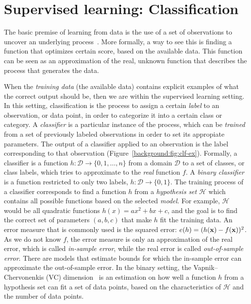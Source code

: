 \section{Supervised learning: Classification}

The basic premise of learning from data is the use of a set of observations to
uncover an underlying process~\cite{Abu-Mostafa:2012:LD:2207825}. 
%
More formally, a way to see this is finding a function that optimizes certain
score, based on the available data. 
%
This function can be seen as an approximation of the real, unknown function
that describes the process that generates the data.


When the {\em training data} (the available data) contains explicit examples of
what the correct output should be, then we are within the supervised learning
setting.
%
In this setting, classification is the process to assign a certain {\em label}
to an observation, or data point, in order to categorize it into a certain class
or category.
%
A {\em classifier} is a particular instance of the process, which can be {\em
trained} from a set of previously labeled observations in order to set its
appropiate parameters.
%
The output of a classifier applied to an observation is the label corresponding
to that observation (Figure~\ref{background:fig:clf-ex}).
%
Formally, a classifier is a function $h: \mathcal{D} \rightarrow \{0, 1, \ldots,
n\}$ from a domain $\mathcal{D}$ to a set of classes, or class labels, which
tries to approximate to the {\em real} function $f$.
%
A {\em binary classifier} is a function restricted to only two labels, $h:
\mathcal{D} \rightarrow \{0, 1\}$.
%
The training process of a classifier corresponds to find a function $h$ from a
{\em hypothesis set} $\mathcal{H}$ which contains all possible functions based
on the selected {\em model}.
%
For example, $\mathcal{H}$ would be all quadratic functions $h(x) = ax^2 + bx +
c$, and the goal is to find the correct set of parameters $(a, b, c)$ that make
$h$ fit the training data.
%
An error measure that is commonly used is the squared error: $e(h) =
(h(\boldsymbol{\mathbf{x}}) - f(\boldsymbol{\mathbf{x}}))^2$.
%
As we do not know $f$, the error measure is only an approximation of the real
error, which is called {\em in-sample error}, while the real error is called
{\em out-of-sample error}.
% 
There are models that estimate bounds for which the in-sample error can
approximate the out-of-sample error.
%
In the binary setting, the Vapnik–Chervonenkis (VC) dimension~\cite{Vapnik2015}
is an estimation on how well a function $h$ from a hypothesis set can fit a set
of data points, based on the characteristics of $\mathcal{H}$ and the number of
data points.

